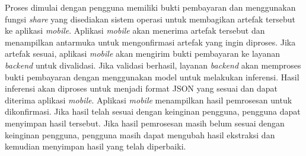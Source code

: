 Proses dimulai dengan pengguna memiliki bukti pembayaran dan menggunakan fungsi \emph{share} yang disediakan sistem operasi untuk membagikan artefak tersebut ke aplikasi \emph{mobile}. Aplikasi \emph{mobile} akan menerima artefak tersebut dan menampilkan antarmuka untuk mengonfirmasi artefak yang ingin diproses. Jika artefak sesuai, aplikasi \emph{mobile} akan mengirim bukti pembayaran ke layanan \emph{backend} untuk divalidasi. Jika validasi berhasil, layanan \emph{backend} akan memproses bukti pembayaran dengan menggunakan model \donut{} untuk melakukan inferensi. Hasil inferensi akan diproses untuk menjadi format JSON yang sesuai dan dapat diterima aplikasi \emph{mobile}. Aplikasi \emph{mobile} menampilkan hasil pemrosesan untuk dikonfirmasi. Jika hasil telah sesuai dengan keinginan pengguna, pengguna dapat menyimpan hasil tersebut. Jika hasil pemrosesan masih belum sesuai dengan keinginan pengguna, pengguna masih dapat mengubah hasil ekstraksi dan kemudian menyimpan hasil yang telah diperbaiki.
